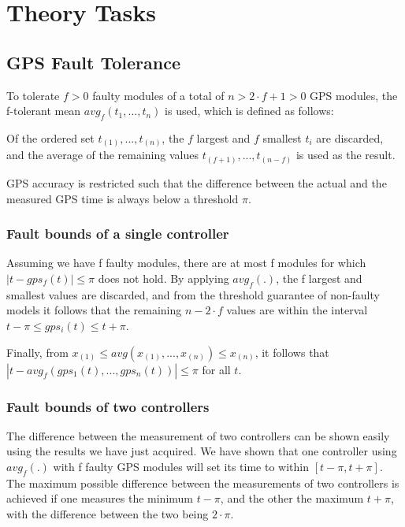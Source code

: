 \documentclass[12pt,a4paper,titlepage,oneside]{article}
\begin{document}
\section{Theory Tasks}

\subsection{GPS Fault Tolerance}

To tolerate $f > 0$ faulty modules of a total of $n > 2 \cdot f + 1 >
0$ GPS modules, the f-tolerant mean $avg_f(t_1, ... , t_n)$ is used, which is
defined as follows:

Of the ordered set $t_{(1)}, ... , t_{(n)}$, the $f$ largest and $f$ smallest
$t_i$ are discarded, and the average of the remaining values $t_{(f + 1)}, ...,
t_{(n - f)}$ is used as the result.

GPS accuracy is restricted such that the difference between the actual and the
measured GPS time is always below a threshold $\pi$.

\subsubsection{Fault bounds of a single controller}

Assuming we have f faulty modules, there are at most f modules for which
$|t-gps_f(t)| \leq \pi$ does not hold. By applying $avg_f(.)$, the f largest and
smallest values are discarded, and from the threshold guarantee of non-faulty
models it follows that the remaining $n - 2 \cdot f$ values are within the
interval $t - \pi \leq gps_i(t) \leq t + \pi$.

Finally, from $x_{(1)} \leq avg(x_{(1)}, ..., x_{(n)}) \leq x_{(n)}$, it follows
that $|t - avg_f(gps_1(t), ..., gps_n(t))| \leq \pi$ for all $t$.

\subsubsection{Fault bounds of two controllers}

The difference between the measurement of two controllers can be shown easily
using the results we have just acquired. We have shown that one controller using
$avg_f(.)$ with f faulty GPS modules will set its time to within $[t - \pi, t +
\pi]$. The maximum possible difference between the measurements of two
controllers is achieved if one measures the minimum $t - \pi$, and the other the
maximum $t + \pi$, with the difference between the two being $2 \cdot \pi$.
\end{document}
